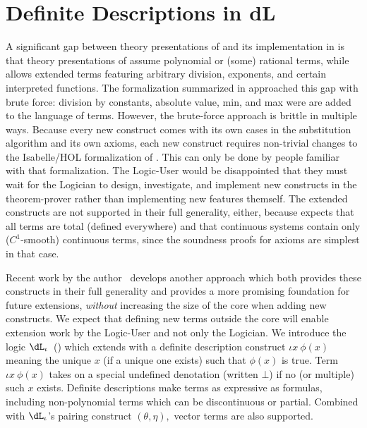 \documentclass[12pt]{cmuthesis}
\theoremstyle{definition}
\theoremstyle{remark}
\newcommand{\meps}[2]{\iota{#1}~{#2}}
\newcommand{\rref}[2][]{\prettyref{#2}}
\newcommand{\dLi}{\ensuremath{\dL_\iota}\xspace}
\begin{document}
\section{Definite Descriptions in dL}
\label{sec:definite-description}
A significant gap between theory presentations of \dL and its implementation in \KeYmaeraX is that theory presentations of \dL assume polynomial or (some) rational terms, while \KeYmaeraX allows extended terms featuring arbitrary division, exponents, and certain interpreted functions.
The formalization summarized in \rref{sec:isabelle-fml} approached this gap with brute force: division by constants, absolute value, min, and max were are added to the language of terms.
However, the brute-force approach is brittle in multiple ways.
Because every new construct comes with its own cases in the substitution algorithm and its own axioms, each new construct requires non-trivial changes to the Isabelle/HOL formalization of \dL.
This can only be done by people familiar with that formalization.
The Logic-User would be disappointed that they must wait for the Logician to design, investigate, and implement new constructs in the theorem-prover rather than implementing new features themself.
The extended constructs are not supported in their full generality, either, because \dL expects that all terms are total (defined everywhere) and that continuous systems contain only ($C^1$-smooth) continuous terms, since the soundness proofs for \dL axioms are simplest in that case.

Recent work by the author~\cite{DBLP:conf/cade/BohrerFP19} develops another approach which both provides these constructs in their full generality and provides a more promising foundation for future extensions, \emph{without} increasing the size of the core when adding new constructs.
We expect that defining new terms outside the core will enable extension work by the Logic-User and not only the Logician.
We introduce the logic \dLi~(\rref{fig:dli-overview}) which extends \dL with a definite description construct $\meps{x}{\phi(x)}$ meaning the unique $x$ (if a unique one exists) such that $\phi(x)$ is true.
Term $\meps{x}{\phi(x)}$ takes on a special undefined denotation (written $\bot$) if no (or multiple) such $x$ exists.
Definite descriptions make terms as expressive as formulas, including non-polynomial terms which can be discontinuous or partial.
Combined with $\dLi$'s pairing construct $(\theta,\eta),$ vector terms are also supported.
\end{document}
